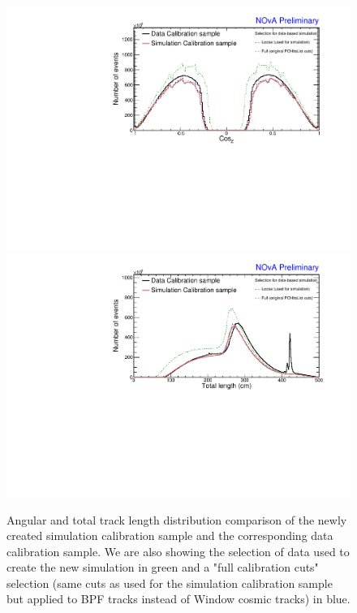 \begin{figure}[!ht]
\includegraphics[width=\textwidth]{Plots/TBCalibration/DBSim_DataMCComparison_CosZ.pdf}
\includegraphics[width=\textwidth]{Plots/TBCalibration/DBSim_DataMCComparison_TotLength.pdf}
\caption[Data-Simulation comparison of angular and track length distributions]{Angular and total track length distribution comparison of the newly created simulation calibration sample and the corresponding data calibration sample. We are also showing the selection of data used to create the new simulation in green and a "full calibration cuts" selection (same cuts as used for the simulation calibration sample but applied to \acrshort{BPF} tracks instead of Window cosmic tracks) in blue.}
\label{fig:DataBasedSimDataMCComparison_cosZtotLength}
\end{figure}

